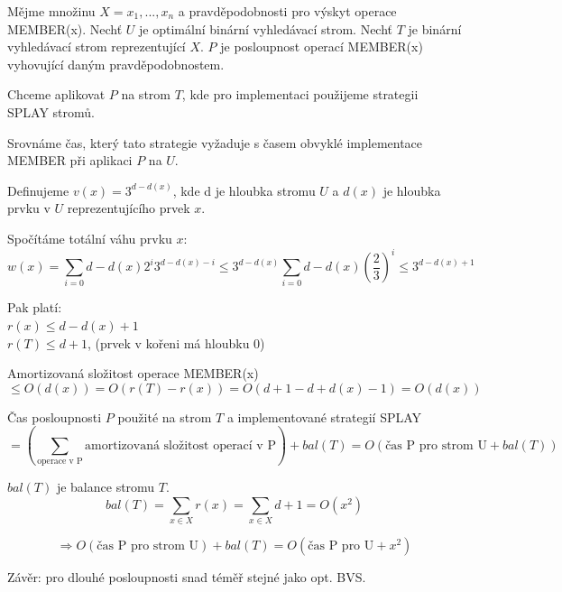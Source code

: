 
\begin{priklad}
Mějme množinu $X={x_1,...,x_n}$ a pravděpodobnosti pro výskyt operace
MEMBER(x). Nechť $U$ je optimální binární vyhledávací strom. Nechť $T$ je
binární vyhledávací strom reprezentující $X$. $P$ je posloupnost operací
MEMBER(x) vyhovující daným pravděpodobnostem.
\par
Chceme aplikovat $P$ na strom $T$, kde pro implementaci použijeme strategii
SPLAY stromů.
\par
Srovnáme čas, který tato strategie vyžaduje s časem obvyklé implementace
MEMBER při aplikaci $P$ na $U$.
\par
Definujeme $v(x) = 3^{d-d(x)}$, kde d je hloubka stromu $U$ a $d(x)$ je
hloubka prvku v $U$ reprezentujícího prvek $x$.
\par
Spočítáme totální váhu prvku $x$:
$$w(x) = \sum_{i=0}{d-d(x)} 2^i3^{d-d(x)-i} 
\leq 3^{d-d(x)} \sum_{i=0}{d-d(x)} (\frac{2}{3})^i \leq 3^{d-d(x)+1}$$
\par
Pak platí: \\
$r(x) \leq d-d(x)+1$ \\
$r(T) \leq d+1$, (prvek v kořeni má hloubku $0$)
\par
Amortizovaná složitost operace MEMBER(x) 
$$\leq O(d(x)) = 
O(r(T)-r(x)) = O(d+1-d+d(x)-1) = O(d(x))$$
\par
Čas posloupnosti $P$ použité na strom $T$ a implementované strategií SPLAY 
$$= (\sum_{\text{operace v P}}{} \text{amortizovaná složitost operací v P}) +
bal(T) = O(\text{čas P pro strom U} + bal(T))$$
\par
$bal(T)$ je balance stromu $T$. 
$$bal(T) = \sum_{x \in X}{} r(x) = 
\sum_{x \in X}{} d+1 = O(x^2)$$
\par
$$\Rightarrow  O(\text{čas P pro strom U}) + bal(T) = 
O(\text{čas P pro U} + x^2)$$
\par
Závěr: pro dlouhé posloupnosti snad téměř stejné jako opt. BVS.
\end{priklad}

